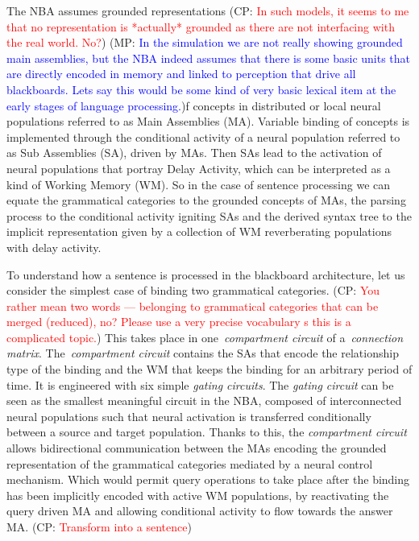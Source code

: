 \documentclass[10pt]{article}
\newcommand{\noteCP}[1]{(CP: \textcolor{red}{#1})}
\newcommand{\noteMP}[2]{(MP: \textcolor{blue}{#1})}
\begin{document}
The NBA assumes grounded representations
\noteCP{In such models, it seems to me that no representation is *actually* grounded as there are not interfacing with the real world. No?}
\noteMP{In the simulation we are not really showing grounded main assemblies, but the NBA indeed assumes that there is some basic units that are directly encoded in memory and linked to perception that drive all blackboards. Lets say this would be some kind of very basic lexical item at the early stages of language processing.}
of concepts in distributed or local neural populations referred to as Main Assemblies (MA).
Variable binding of concepts is implemented through the conditional activity of a neural population referred to as Sub Assemblies (SA), driven by MAs.
Then SAs lead to the activation of neural populations that portray Delay Activity\cite{de_Kamps_2005}, which can be interpreted as a kind of Working Memory (WM). So in the case of sentence processing we can equate the grammatical categories to the grounded concepts of MAs, the parsing process to the conditional activity igniting SAs and the derived syntax tree to the implicit representation given by a collection of WM reverberating populations with delay activity.

To understand how a sentence is processed in the blackboard architecture, let us consider the simplest case of binding two grammatical categories.
\noteCP{You rather mean two words --- belonging to grammatical categories that can be merged (reduced), no? Please use a very precise vocabulary s this is a complicated topic.}
This takes place in one~\emph{compartment circuit} of a~\emph{connection matrix}.
The~\emph{compartment circuit} contains the SAs that encode the relationship type of the binding and the WM that keeps the binding for an arbitrary period of time.
It is engineered with six simple \emph{gating circuits}.
The \emph{gating circuit} can be seen as the smallest meaningful circuit in the NBA, composed of interconnected neural populations such that neural activation is transferred conditionally between a source and target population.
Thanks to this, the \emph{compartment circuit} allows bidirectional communication between the MAs encoding the grounded representation of the grammatical categories mediated by a neural control mechanism.
Which would permit query operations to take place after the binding has been implicitly encoded with active WM populations, by reactivating the query driven MA and allowing conditional activity to flow towards the answer MA.
\noteCP{Transform into a sentence}
\end{document}
